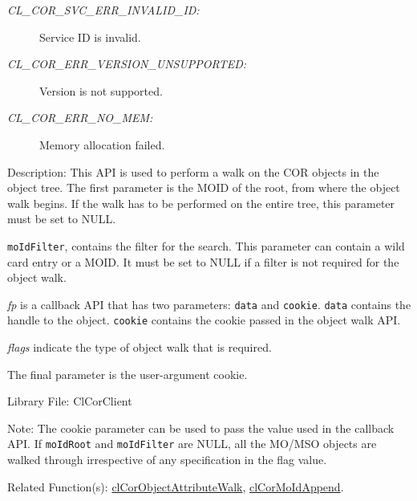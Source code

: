 \begin{flushleft}
\begin{Desc}
\begin{description}
\item[{\em CL\_\-COR\_\-SVC\_\-ERR\_\-INVALID\_\-ID:}]Service ID is invalid. 
\item[{\em CL\_\-COR\_\-ERR\_\-VERSION\_\-UNSUPPORTED:}]Version is not supported. 
\item[{\em CL\_\-COR\_\-ERR\_\-NO\_\-MEM:}]Memory allocation failed.\end{description}
\end{Desc}
\begin{Desc}
\item[Description:]This API is used to perform a walk on the COR objects in the object tree. The first parameter is the MOID of the 
root, from where the object walk begins. If the walk has to be performed on the entire tree, this parameter must be set to NULL. 
\par
{\tt{moIdFilter}}, contains the filter for the search. This parameter can contain a wild card entry or a MOID. It
must be set to NULL if a filter is not required for the object walk. 
\par
{\em fp\/} is a callback API that has two parameters: {\tt{data}} and {\tt{cookie}}. {\tt{data}} contains the handle to the object.
{\tt{cookie}} contains the cookie passed in the object walk API. 
\par
{\em flags\/} indicate the type of object walk that is required. 
\par
The final parameter is the user-argument cookie.\end{Desc}
\begin{Desc}
\item[Library File:]Cl\-Cor\-Client\end{Desc}
\begin{Desc}
\item[Note:]The cookie parameter can be used to pass the value used in the callback API. If {\tt{moIdRoot}} and {\tt{moIdFilter}} are NULL,
all the MO/MSO objects are walked through irrespective of any specification in the flag value.\end{Desc}
\begin{Desc}
\item[Related Function(s):]\hyperlink{pagecor108}{cl\-Cor\-Object\-Attribute\-Walk}, \hyperlink{pagecor117}{cl\-Cor\-MoId\-Append}. \end{Desc}
\newpage










\end{flushleft}
